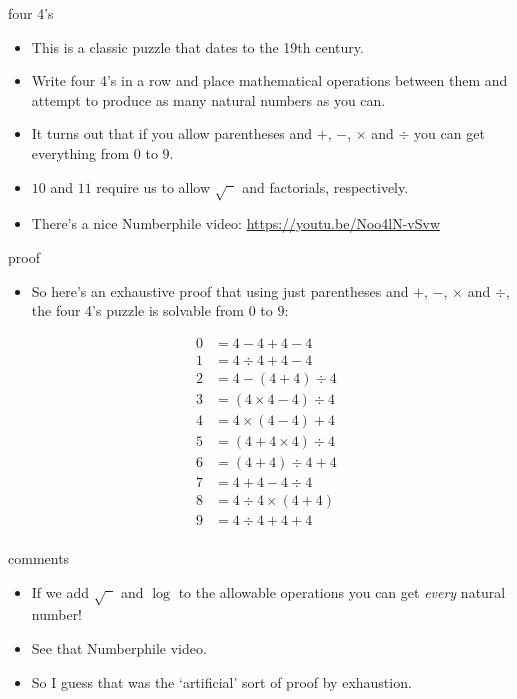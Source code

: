 \documentclass[landscape]{beamer}
\begin{document}
\begin{frame}{four 4's}
\begin{itemize}
\item This is a classic puzzle that dates to the 19th century. \pause
\item Write four 4's in a row and place mathematical operations between them and attempt to produce as many natural numbers as you can. \pause
\item It turns out that if you allow parentheses and $+$, $-$, $\times$ and $\div$ you can get everything from $0$ 
to $9$. \pause
\item $10$ and $11$ require us to allow $\sqrt{\phantom{x}}$ and factorials, respectively.
\item There's a nice Numberphile video:  \href{https://youtu.be/Noo4lN-vSvw}{https://youtu.be/Noo4lN-vSvw}
\end{itemize}
\end{frame}

\begin{frame}{proof}
\begin{itemize}
\item So here's an exhaustive proof that using just parentheses and $+$, $-$, $\times$ and $\div$, the four 4's puzzle is solvable from $0$ to $9$: \pause

\begin{align*}
 0  & =  4 - 4 + 4 - 4 &  \\
 1  & =  4 \div 4 + 4 - 4 & \\
 2  & =  4 - (4 + 4) \div 4  & \\
 3  & =  (4 \times 4 - 4) \div 4 & \\
 4  & =  4 \times (4 - 4) + 4 & \\
 5  & =  (4 + 4 \times 4) \div 4 & \\
 6  & =  (4 + 4) \div 4 + 4  & \\
 7  & =  4 + 4 - 4 \div 4  & \\
 8  & =  4 \div 4 \times (4 + 4) &  \\
 9  & =  4 \div 4 + 4 + 4  & \\
\end{align*}

\end{itemize}
\end{frame}

\begin{frame}{comments}
\begin{itemize}
\item If we add $\sqrt{\phantom{x}}$ and $\log$ to the allowable operations you can get {\em every} natural number! \pause
\item See that Numberphile video. \pause
\item So I guess that was the `artificial' sort of proof by exhaustion. \pause
\end{itemize}
\end{frame}
\end{document}
